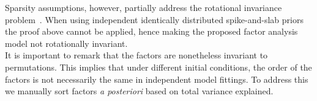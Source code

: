 Sparsity assumptions, however, partially address the rotational invariance problem~\cite{Hore2015-thesis}. When using independent identically distributed spike-and-slab priors the proof above cannot be applied, hence making the proposed factor analysis model not rotationally invariant.\\

It is important to remark that the factors are nonetheless invariant to permutations. This implies that under different initial conditions, the order of the factors is not necessarily the same in independent model fittings. To address this we manually sort factors \textit{a posteriori} based on total variance explained.


